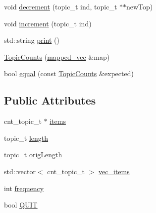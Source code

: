 \begin{DoxyCompactItemize}
void \hyperlink{struct_topic_counts_a0c6d1cf4216657d55566b56923c71122}{decrement} (topic\_\-t ind, topic\_\-t $\ast$$\ast$newTop)
\item 
void \hyperlink{struct_topic_counts_a326672023fd147088bd27a4a5f33c0c1}{increment} (topic\_\-t ind)
\item 
std::string \hyperlink{struct_topic_counts_ae8b91f5e30f6cc071f31db43f39e66e9}{print} ()
\item 
\hyperlink{struct_topic_counts_aafbb66681d6b34ac5c272a2d38f4ddcb}{TopicCounts} (\hyperlink{types_8h_a4fed6ff282eca8f2c6ebdb4bc2e99e8b}{mapped\_\-vec} \&map)
\item 
bool \hyperlink{struct_topic_counts_a6ce31e2d544126f259f5f07117552284}{equal} (const \hyperlink{struct_topic_counts}{TopicCounts} \&expected)
\end{DoxyCompactItemize}
\subsection*{Public Attributes}
\begin{DoxyCompactItemize}
\item 
cnt\_\-topic\_\-t $\ast$ \hyperlink{struct_topic_counts_a50185bb9cf12838252564d28c00e59a7}{items}
\item 
topic\_\-t \hyperlink{struct_topic_counts_abbecea34e46a52c0bfec37872960e18d}{length}
\item 
topic\_\-t \hyperlink{struct_topic_counts_af564d3c9b1e333865e07e0e9bcad497f}{origLength}
\item 
std::vector$<$ cnt\_\-topic\_\-t $>$ \hyperlink{struct_topic_counts_a8f8362bcc278b7a7bdccec005f21c4a0}{vec\_\-items}
\item 
int \hyperlink{struct_topic_counts_a13c5a4d017260fe85c564319f0a4fe90}{frequency}
\item 
bool \hyperlink{struct_topic_counts_a4bd537cce5cd7adadc45e3355bf5a943}{QUIT}
\end{DoxyCompactItemize}


